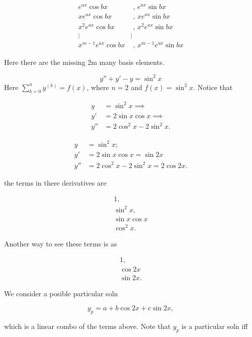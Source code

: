 \begin{align*}
  e^{ax} \cos bx &\text{ , } e^{ax} \sin bx \\
  xe^{ax} \cos bx &\text{ , } xe^{ax} \sin bx \\
  x^2e^{ax} \cos bx &\text{ , } x^2e^{ax} \sin bx \\
  \vdots & \vdots  \\
  x^{m-1}e^{ax} \cos bx &\text{ , } x^{m-1}e^{ax} \sin bx
\end{align*}

Here there are the missing 2m many basis elements. 


\begin{example}
  \[ y'' + y' - y = \sin^2x \]
  Here \( \sum_{k=0}^{n} y^{(k)} = f(x) \), where \( n=2 \) and \( f(x) =
  \sin^2x\). Notice that 

  \begin{align*}
    y &= \sin^2x \implies \\
    y' &= 2 \sin x \cos x \implies \\
    y'' &= 2 \cos^2x - 2\sin^2x.
  \end{align*}

  \begin{align*}
    y &= \sin^2x; \\
    y' &= 2 \sin x \cos x = \sin 2x \\
    y'' &= 2 \cos^2x - 2\sin^2x = 2 \cos 2x.
  \end{align*}

  the terms in there derivatives are 

  \begin{align*}
    1, \\
    \sin^2x, \\
    \sin x \cos x \\
    \cos^2x. 
  \end{align*}

  Another way to see these terms is as 

  \begin{align*}
    1, \\
    \cos 2x \\
    \sin 2x. 
  \end{align*}

  We consider a posible particular soln 

  \[ y_p = a + b\cos 2x + c \sin 2x, \]

  which is a linear combo of the terms above. Note that \( y_p \) is a
  particular soln iff 


\end{example}
